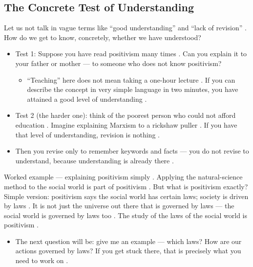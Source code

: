 \subsection{The Concrete Test of Understanding}
Let us not talk in vague terms like ``good understanding'' and ``lack of revision'' . How do we get to know, concretely, whether we have understood? 
\begin{itemize}
    \item Test 1: Suppose you have read positivism many times . Can you explain it to your father or mother --- to someone who does not know positivism? 
    \begin{itemize}
        \item ``Teaching'' here does not mean taking a one-hour lecture . If you can describe the concept in very simple language in two minutes, you have attained a good level of understanding .
    \end{itemize}
    \item Test 2 (the harder one): think of the poorest person who could not afford education . Imagine explaining Marxism to a rickshaw puller . If you have that level of understanding, revision is nothing .
    \item Then you revise only to remember keywords and facts --- you do not revise to understand, because understanding is already there .
\end{itemize}

\begin{ExampleBox}
Worked example --- explaining positivism simply . Applying the natural-science method to the social world is part of positivism . But what is positivism exactly? Simple version: positivism says the social world has certain laws; society is driven by laws . It is not just the universe out there that is governed by laws --- the social world is governed by laws too . The study of the laws of the social world is positivism .
\begin{itemize}
    \item The next question will be: give me an example --- which laws? How are our actions governed by laws? If you get stuck there, that is precisely what you need to work on .
\end{itemize}
\end{ExampleBox}

